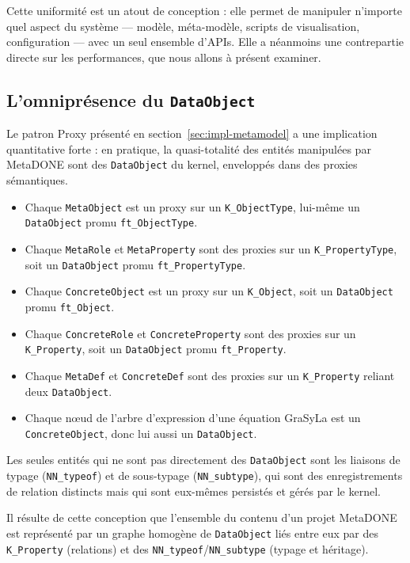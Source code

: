 Cette uniformité est un atout de conception : elle permet de manipuler
n'importe quel aspect du système --- modèle, méta-modèle, scripts de
visualisation, configuration --- avec un seul ensemble d'APIs. Elle a
néanmoins une contrepartie directe sur les performances, que nous allons
à présent examiner.

\subsection{L'omniprésence du \texttt{DataObject}}

Le patron Proxy présenté en section~\ref{sec:impl-metamodel} a une
implication quantitative forte : en pratique, la quasi-totalité des
entités manipulées par MetaDONE sont des \texttt{DataObject} du kernel,
enveloppés dans des proxies sémantiques.

\begin{itemize}
    \item Chaque \texttt{MetaObject} est un proxy sur un
    \texttt{K\_ObjectType}, lui-même un \texttt{DataObject} promu
    \texttt{ft\_ObjectType}.
    \item Chaque \texttt{MetaRole} et \texttt{MetaProperty} sont des
    proxies sur un \texttt{K\_PropertyType}, soit un \texttt{DataObject}
    promu \texttt{ft\_PropertyType}.
    \item Chaque \texttt{ConcreteObject} est un proxy sur un
    \texttt{K\_Object}, soit un \texttt{DataObject} promu
    \texttt{ft\_Object}.
    \item Chaque \texttt{ConcreteRole} et \texttt{ConcreteProperty} sont
    des proxies sur un \texttt{K\_Property}, soit un \texttt{DataObject}
    promu \texttt{ft\_Property}.
    \item Chaque \texttt{MetaDef} et \texttt{ConcreteDef} sont des
    proxies sur un \texttt{K\_Property} reliant deux \texttt{DataObject}.
    \item Chaque nœud de l'arbre d'expression d'une équation GraSyLa est
    un \texttt{ConcreteObject}, donc lui aussi un \texttt{DataObject}.
\end{itemize}

Les seules entités qui ne sont pas directement des \texttt{DataObject}
sont les liaisons de typage (\texttt{NN\_typeof}) et de sous-typage
(\texttt{NN\_subtype}), qui sont des enregistrements de relation distincts mais qui sont eux-mêmes persistés et gérés par le kernel.

Il résulte de cette conception que l'ensemble du contenu d'un projet MetaDONE est représenté par un graphe homogène de \texttt{DataObject} liés entre
eux par des \texttt{K\_Property} (relations) et des
\texttt{NN\_typeof}/\texttt{NN\_subtype} (typage et héritage).

